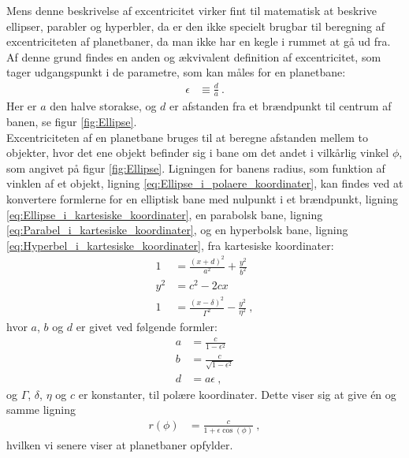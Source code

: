 Mens denne beskrivelse af excentricitet virker fint til matematisk at beskrive ellipser, parabler og hyperbler, da er den ikke specielt brugbar til beregning af excentriciteten af planetbaner, da man ikke har en kegle i rummet at gå ud fra. Af denne grund findes en anden og ækvivalent definition af excentricitet, som tager udgangspunkt i de parametre, som kan måles for en planetbane:
\begin{align}
	\epsilon &\equiv \frac{d}{a} \: .
\end{align}
Her er $a$ den halve storakse, og $d$ er afstanden fra et brændpunkt til centrum af banen, se figur \ref{fig:Ellipse}. \\
\noindent
Excentriciteten af en planetbane bruges til at beregne afstanden mellem to objekter, hvor det ene objekt befinder sig i bane om det andet i vilkårlig vinkel $\phi$, som angivet på figur \ref{fig:Ellipse}. Ligningen for banens radius, som funktion af vinklen af et objekt, ligning \eqref{eq:Ellipse_i_polaere_koordinater}, kan findes ved at konvertere formlerne for en elliptisk bane med nulpunkt i et brændpunkt, ligning \eqref{eq:Ellipse_i_kartesiske_koordinater}, en parabolsk bane, ligning \eqref{eq:Parabel_i_kartesiske_koordinater}, og en hyperbolsk bane, ligning \eqref{eq:Hyperbel_i_kartesiske_koordinater}, fra kartesiske koordinater:
\begin{align}
	1 &= \frac{(x+d)^2}{a^2} + \frac{y^2}{b^2} \label{eq:Ellipse_i_kartesiske_koordinater} \\
	y^2 &= c^2 - 2cx \label{eq:Parabel_i_kartesiske_koordinater} \\
	1 &= \frac{(x-\delta)^2}{\Gamma^2}-\frac{y^2}{\eta^2} \: , \label{eq:Hyperbel_i_kartesiske_koordinater}
\end{align}
hvor $a$, $b$ og $d$ er givet ved følgende formler:
\begin{equation} \label{eq:Planetbevaegelse_a_b_og_d}
	\begin{aligned}
		a &= \frac{c}{1-\epsilon^2} \\
		b &= \frac{c}{\sqrt{1-\epsilon^2}} \\
		d &= a\epsilon \: ,
	\end{aligned}
\end{equation}
og $\Gamma$, $\delta$, $\eta$ og $c$ er konstanter, til polære koordinater. Dette viser sig at give én og samme ligning
\begin{align} \label{eq:Ellipse_i_polaere_koordinater}
	r(\phi) &= \frac{c}{1+\epsilon\cos(\phi)} \: ,
\end{align}
hvilken vi senere viser at planetbaner opfylder.

